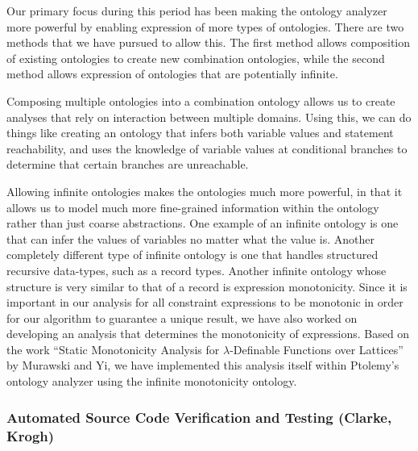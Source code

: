                Our primary focus during this period has been making the ontology
               analyzer more powerful by enabling expression of more types of
               ontologies.  There are two methods that we have pursued to allow this.
               The first method allows composition of existing ontologies to create
               new combination ontologies, while the second method allows expression
               of ontologies that are potentially infinite.

               Composing multiple ontologies into a combination ontology allows us to
               create analyses that rely on interaction between multiple domains.
               Using this, we can do things like creating an ontology that infers
               both variable values and statement reachability, and uses the
               knowledge of variable values at conditional branches to determine that
               certain branches are unreachable.

               Allowing infinite ontologies makes the ontologies much more powerful,
               in that it allows us to model much more fine-grained information
               within the ontology rather than just coarse abstractions.  One example
               of an infinite ontology is one that can infer the values  of variables
               no matter what the value is.  Another completely different type of
               infinite ontology is one that handles structured recursive data-types,
               such as a record types.   Another infinite ontology whose structure is
               very similar to that of a record is expression monotonicity. Since it
               is important in our analysis for all constraint expressions to be
               monotonic in order for our algorithm to guarantee a unique result, we
               have also worked on developing an analysis that determines the
               monotonicity of expressions.  Based on the work ``Static Monotonicity
               Analysis for $\lambda$-Definable Functions over Lattices'' by Murawski
               and Yi\cite{Murawski02},
               we have implemented this analysis itself within Ptolemy's ontology
               analyzer using the infinite monotonicity ontology.

\subsubsection{Automated Source Code Verification and Testing (Clarke, Krogh)}

